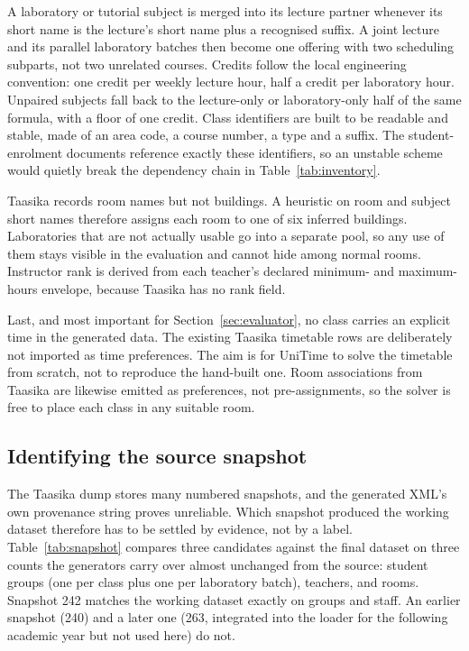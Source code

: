 \documentclass[journal]{IEEEtran}
\begin{document}
A laboratory or tutorial subject is merged into its lecture partner whenever its short name is the lecture's short name plus a recognised suffix. A joint lecture and its parallel laboratory batches then become one offering with two scheduling subparts, not two unrelated courses. Credits follow the local engineering convention: one credit per weekly lecture hour, half a credit per laboratory hour. Unpaired subjects fall back to the lecture-only or laboratory-only half of the same formula, with a floor of one credit. Class identifiers are built to be readable and stable, made of an area code, a course number, a type and a suffix. The student-enrolment documents reference exactly these identifiers, so an unstable scheme would quietly break the dependency chain in Table~\ref{tab:inventory}.

Taasika records room names but not buildings. A heuristic on room and subject short names therefore assigns each room to one of six inferred buildings. Laboratories that are not actually usable go into a separate pool, so any use of them stays visible in the evaluation and cannot hide among normal rooms. Instructor rank is derived from each teacher's declared minimum- and maximum-hours envelope, because Taasika has no rank field.

Last, and most important for Section~\ref{sec:evaluator}, no class carries an explicit time in the generated data. The existing Taasika timetable rows are deliberately not imported as time preferences. The aim is for UniTime to solve the timetable from scratch, not to reproduce the hand-built one. Room associations from Taasika are likewise emitted as preferences, not pre-assignments, so the solver is free to place each class in any suitable room.

\subsection{Identifying the source snapshot}
The Taasika dump stores many numbered snapshots, and the generated XML's own provenance string proves unreliable. Which snapshot produced the working dataset therefore has to be settled by evidence, not by a label. Table~\ref{tab:snapshot} compares three candidates against the final dataset on three counts the generators carry over almost unchanged from the source: student groups (one per class plus one per laboratory batch), teachers, and rooms. Snapshot 242 matches the working dataset exactly on groups and staff. An earlier snapshot (240) and a later one (263, integrated into the loader for the following academic year but not used here) do not.
\end{document}
